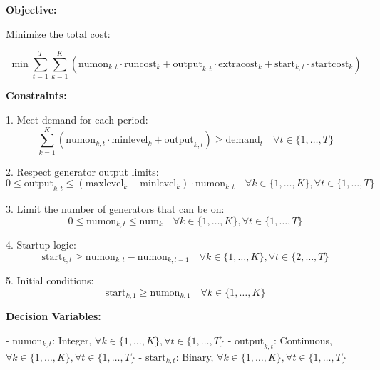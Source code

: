 \documentclass{article}
\begin{document}
\textbf{Objective:}

Minimize the total cost:

\[
\min \sum_{t=1}^{T} \sum_{k=1}^{K} \left( \text{numon}_{k,t} \cdot \text{runcost}_{k} + \text{output}_{k,t} \cdot \text{extracost}_{k} + \text{start}_{k,t} \cdot \text{startcost}_{k} \right)
\]

\textbf{Constraints:}

1. Meet demand for each period:
\[
\sum_{k=1}^{K} \left( \text{numon}_{k,t} \cdot \text{minlevel}_{k} + \text{output}_{k,t} \right) \geq \text{demand}_{t} \quad \forall t \in \{1,\ldots,T\}
\]

2. Respect generator output limits:
\[
0 \leq \text{output}_{k,t} \leq (\text{maxlevel}_{k} - \text{minlevel}_{k}) \cdot \text{numon}_{k,t} \quad \forall k \in \{1,\ldots,K\}, \forall t \in \{1,\ldots,T\}
\]

3. Limit the number of generators that can be on:
\[
0 \leq \text{numon}_{k,t} \leq \text{num}_{k} \quad \forall k \in \{1,\ldots,K\}, \forall t \in \{1,\ldots,T\}
\]

4. Startup logic:
\[
\text{start}_{k,t} \geq \text{numon}_{k,t} - \text{numon}_{k,t-1} \quad \forall k \in \{1,\ldots,K\}, \forall t \in \{2,\ldots,T\}
\]

5. Initial conditions:
\[
\text{start}_{k,1} \geq \text{numon}_{k,1} \quad \forall k \in \{1,\ldots,K\}
\]

\textbf{Decision Variables:}

- \( \text{numon}_{k,t} \): Integer, \( \forall k \in \{1,\ldots,K\}, \forall t \in \{1,\ldots,T\} \)
- \( \text{output}_{k,t} \): Continuous, \( \forall k \in \{1,\ldots,K\}, \forall t \in \{1,\ldots,T\} \)
- \( \text{start}_{k,t} \): Binary, \( \forall k \in \{1,\ldots,K\}, \forall t \in \{1,\ldots,T\} \)
\end{document}
